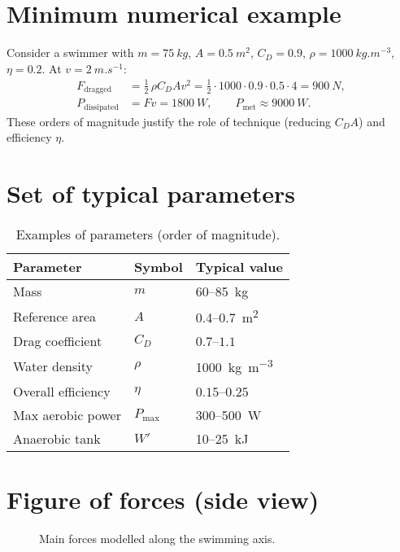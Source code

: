 \documentclass[12pt,a4paper]{article}
\begin{document}
\section{Minimum numerical example}
Consider a swimmer with $m=\SI{75}{kg}$, $A=\SI{0.5}{m^2}$, $C_D=0.9$, $\rho=\SI{1000}{kg.m^{-3}}$, $\eta=0.2$. At $v=\SI{2}{m.s^{-1}}$:
\begin{align}
 F_{\mathrm{dragged}} &= \tfrac{1}{2}\,\rho C_D A v^2 = \tfrac{1}{2}\cdot1000\cdot0.9\cdot0.5\cdot 4 = \SI{900}{N}, \\
 P_{\mathrm{dissipated}} &= Fv = \SI{1800}{W}, \qquad P_{\mathrm{met}} \approx \SI{9000}{W}.
 \end{align}
These orders of magnitude justify the role of technique (reducing $C_D A$) and efficiency $\eta$.

\section{Set of typical parameters}
\begin{table}[h]
 \centering
 \caption{Examples of parameters (order of magnitude).}
 \label{tab:param}
 \begin{tabular}{@{}lll@{}} %
  \toprule
  Parameter & Symbol & Typical value \\
  \midrule
  Mass & $m$ & \SI{60}{}--\SI{85}{kg} \\
  Reference area & $A$ & \SI{0.4}{}--\SI{0.7}{m^2} \\
  Drag coefficient & $C_D$ & $0.7$--$1.1$ \\
  Water density & $\rho$ & \SI{1000}{kg.m^{-3}} \\
  Overall efficiency & $\eta$ & $0.15$--$0.25$ \\
  Max aerobic power & $P_{\max}$ & \SI{300}{}--\SI{500}{W} \\
  Anaerobic tank & $W'$ & \SI{10}{}--\SI{25}{kJ} \\
  \bottomrule
 \end{tabular}
\end{table}

\section{Figure of forces (side view)}
\begin{figure}[h]
 \centering
 \caption{Main forces modelled along the swimming axis.}
\end{figure}
\end{document}
